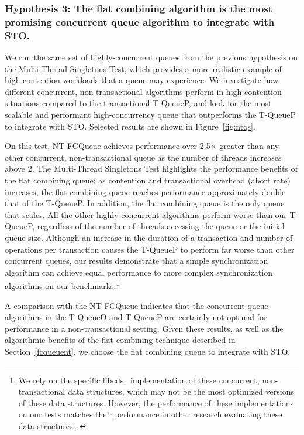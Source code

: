 \subsubsection{Hypothesis 3: The flat combining algorithm is the most promising concurrent queue algorithm to integrate with STO.}
\label{eval:hypo3}

We run the same set of highly-concurrent queues from the previous hypothesis on the Multi-Thread Singletons Test, which provides a more realistic example of high-contention workloads that a queue may experience. We investigate how different concurrent, non-transactional algorithms perform in high-contention situations compared to the transactional T-QueueP, and look for the most scalable and performant high-concurrency queue that outperforms the T-QueueP to integrate with STO. Selected results are shown in Figure~\ref{fig:ntqs}.

On this test, NT-FCQueue achieves performance over 2.5$\times$ greater than any other concurrent, non-transactional queue as the number of threads increases above 2. The Multi-Thread Singletons Test highlights the performance benefits of the flat combining queue: as contention and transactional overhead (abort rate) increases, the flat combining queue reaches performance approximately double that of the T-QueueP. In addition, the flat combining queue is the only queue that scales. All the other highly-concurrent algorithms perform worse than our T-QueueP, regardless of the number of threads accessing the queue or the initial queue size. 
Although an increase in the duration of a transaction and number of operations per transaction causes the T-QueueP to perform far worse than other concurrent queues, our results demonstrate that a simple synchronization algorithm can achieve equal performance to more complex synchronization algorithms on our benchmarks.\footnote{We rely on the specific libcds~\cite{libcds} implementation of these concurrent, non-transactional data structures, which may not be the most optimized versions of these data structures. However, the performance of these implementations on our tests matches their performance in other research evaluating these data structures~\cite{queue1, queue3}.}

A comparison with the NT-FCQueue indicates that the concurrent queue algorithms in the T-QueueO and T-QueueP are certainly not optimal for performance in a non-transactional setting.
Given these results, as well as the algorithmic benefits of the flat combining technique described in Section~\ref{fcqueuent}, we choose the flat combining queue to integrate with STO.

